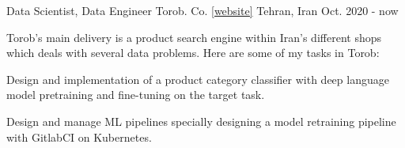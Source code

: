 

\begin{cventries}

  \cventry
    {Data Scientist, Data Engineer} %
    {Torob. Co. \href{https://torob.com/}{[website]}} %
    {Tehran, Iran} %
    {Oct. 2020 - now} %
    {
        Torob's main delivery is a product search engine within Iran's different shops which deals with several data problems.
        Here are some of my tasks in Torob:
        \newline
        \vspace{0.5cm}
      \begin{cvitems} %
        \item {Design and implementation of a product category classifier with deep language model pretraining and fine-tuning on the target task.
        \item Design and manage ML pipelines specially designing a model retraining pipeline with GitlabCI on Kubernetes.}
      \end{cvitems}
    }

\end{cventries}
